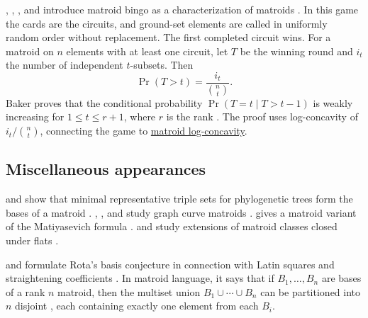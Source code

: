 , , , and
 introduce matroid bingo as a characterization of matroids
\cite{BakerDobbelaereFullmerGajdos2025x}.
In this game the cards are the circuits, and ground-set elements are
called in uniformly random order without replacement. The first completed
circuit wins. For a matroid on $n$ elements with at least one circuit, let
$T$ be the winning round and $i_t$ the number of independent $t$-subsets.
Then
\[
 \Pr(T>t)=\frac{i_t}{\binom nt}.
\]
Baker proves that the conditional probability
$\Pr(T=t\mid T>t-1)$ is weakly increasing for $1\leq t\leq r+1$,
where $r$ is the rank \cite[Thm.~0.3]{Baker2026Bingo}.
The proof uses log-concavity of $i_t/\binom nt$, connecting the game to
\hyperref[matroidLogConcavityStability]{matroid log-concavity}.

\subsection[matroidApplicationsMisc]{Miscellaneous appearances}

 and  show that minimal
representative triple sets for phylogenetic trees form the bases of a matroid
\cite{SeemannHellmuth2018}.  , , and
 study graph curve matroids \cite{GeigerKuehnVlad2023x}.
 gives a matroid variant of the Matiyasevich formula
\cite{Lerner2024x}.   and  study
extensions of matroid classes closed under flats \cite{SinghSivaraman2024x}.

 and  formulate Rota's
basis conjecture in connection with Latin squares and straightening
coefficients \cite[Conj.~4]{HuangRota1994}.  In matroid language, it says
that if $B_1,\dotsc,B_n$ are bases of a rank $n$ matroid, then the multiset
union $B_1\cup\dotsb\cup B_n$ can be partitioned into $n$ disjoint
\label{rainbowBasis}, each containing exactly one
element from each $B_i$.
